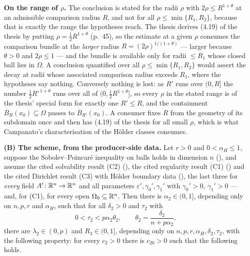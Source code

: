 \begin{helper}
\noindent\textbf{On the range of $\rho$.}  The conclusion is stated for the
radii $\rho$ with $2\rho\le R^{1+\theta}$ at an admissible comparison radius $R$,
and not for all $\rho\le\min\{R_1,R_2\}$, because that is exactly the range the
hypotheses reach.  The thesis derives (4.19) of the thesis by putting
$\rho=\frac12R^{1+\theta}$ (p.~45), so the estimate at a given $\rho$ consumes
the comparison bundle at the \emph{larger} radius $R=(2\rho)^{1/(1+\theta)}$ ---
larger because $\theta>0$ and $2\rho\le1$ --- and the bundle is available only
for radii $\le R_1$ whose closed ball lies in $\Omega$.  A conclusion quantified
over all $\rho\le\min\{R_1,R_2\}$ would assert the decay at radii whose
associated comparison radius exceeds $R_1$, where the hypotheses say nothing.
Conversely nothing is lost: as $R'$ runs over $(0,R]$ the number
$\frac12R'^{\,1+\theta}$ runs over all of $(0,\frac12R^{1+\theta}]$, so every
$\rho$ in the stated range is of the thesis' special form for exactly one
$R'\le R$, and the containment $\overline B_R(x_0)\subseteq\Omega$ passes to
$\overline B_{R'}(x_0)$.  A consumer fixes $R$ from the geometry of its
subdomain once and then has (4.19) of the thesis for all small $\rho$, which is what
Campanato's characterisation of the H\"older classes consumes.

\medskip
\noindent\textbf{(B) The scheme, from the producer-side data.}  Let $r>0$ and
$0<\alpha_H\le1$, suppose the Sobolev--Poincar\'e inequality on balls holds in
dimension $n$ (), and assume the cited
solvability result (C2) (), the cited regularity
result (C1) () and the cited Dirichlet result
(C3) with H\"older boundary data (), the last
three for \emph{every} field $A'\colon\mathbb{R}^n\to\mathbb{R}^n$ and all parameters
$\varepsilon',\gamma_0',\gamma_1'$ with $\gamma_0'>0$, $\gamma_1'>0$ --- and,
for (C1), for every open $\Omega_0\subseteq\mathbb{R}^n$.  Then there is
$\alpha_2\in(0,1]$, depending only on $n,p,r$ and $\alpha_H$, such that for all
$\delta_2>0$ and $\tau_2$ with
\[
0<\tau_2<p\alpha_2\theta_2,\qquad \theta_2=\frac{\delta_2}{n+p\alpha_2},
\]
there are $\lambda_2\in(0,p)$ and $R_3\in(0,1]$, depending only on
$n,p,r,\alpha_H,\delta_2,\tau_2$, with the following property: for every
$c_2>0$ there is $c_{20}>0$ such that the following holds.


\end{helper}
